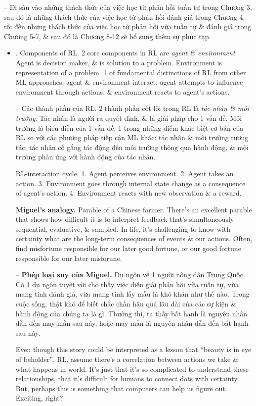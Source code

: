 \documentclass{article}
\begin{document}
\begin{itemize}
    -- Đi sâu vào những thách thức của việc học từ phản hồi tuần tự trong Chương 3, sau đó là những thách thức của việc học từ phản hồi đánh giá trong Chương 4, rồi đến những thách thức của việc học từ phản hồi vừa tuần tự \& đánh giá trong Chương 5-7, \& sau đó là Chương 8-12 sẽ bổ sung thêm sự phức tạp.
    \begin{itemize}
        \item {. Components of RL.} 2 core components in RL are {\it agent \& environment}. Agent is decision maker, \& is solution to a problem. Environment is representation of a problem. 1 of fundamental distinctions of RL from other ML approaches: agent \& environment interact; agent attempts to influence environment through actions, \& environment reacts to agent's actions.

        -- {\sf Các thành phần của RL.} 2 thành phần cốt lõi trong RL là {\it tác nhân \& môi trường}. Tác nhân là người ra quyết định, \& là giải pháp cho 1 vấn đề. Môi trường là biểu diễn của 1 vấn đề. 1 trong những điểm khác biệt cơ bản của RL so với các phương pháp tiếp cận ML khác: tác nhân \& môi trường tương tác; tác nhân cố gắng tác động đến môi trường thông qua hành động, \& môi trường phản ứng với hành động của tác nhân.

        {\sf RL-interaction cycle.} 1. Agent perceives environment. 2. Agent takes an action. 3. Environment goes through internal state change as a consequence of agent's action. 4. Environment reacts with new observation \& a reward.

        {\bf Miguel's analogy.} Parable of a Chinese farmer. There's an excellent parable that shows how difficult it is to interpret feedback that's simultaneously sequential, evaluative, \& sampled. In life, it’s challenging to know with certainty what are the long-term consequences of events \& our actions. Often, find misfortune responsible for our later good fortune, or our good fortune responsible for our later misforune.

        -- {\bf Phép loại suy của Miguel.} Dụ ngôn về 1 người nông dân Trung Quốc. Có 1 dụ ngôn tuyệt vời cho thấy việc diễn giải phản hồi vừa tuần tự, vừa mang tính đánh giá, vừa mang tính lấy mẫu là khó khăn như thế nào. Trong cuộc sống, thật khó để biết chắc chắn hậu quả lâu dài của các sự kiện \& hành động của chúng ta là gì. Thường thì, ta thấy bất hạnh là nguyên nhân dẫn đến may mắn sau này, hoặc may mắn là nguyên nhân dẫn đến bất hạnh sau này.

        Even though this story could be interpreted as a lesson that ``beauty is in eye of beholder'', RL, assume there's a correlation between actions we take \& what happens in world. It's just that it's so complicated to understand these relationships, that it's difficult for humans to connect dots with certainty. But, perhaps this is something that computers can help us figure out. Exciting, right?


\end{itemize}
\end{itemize}
\end{document}
